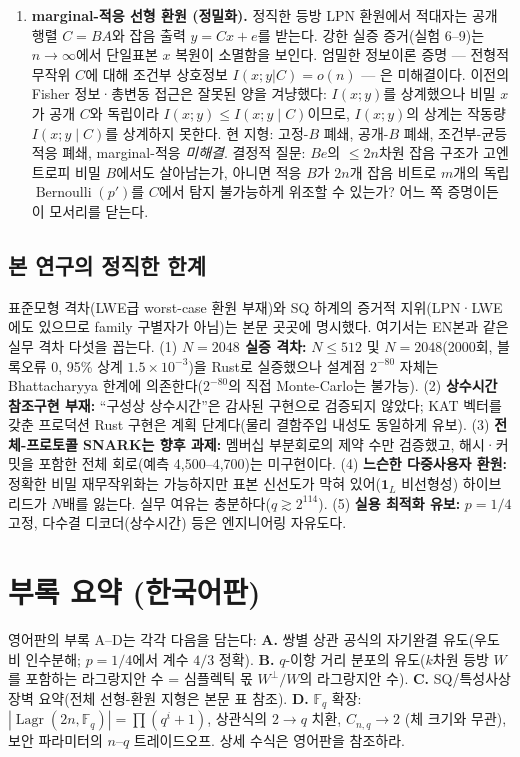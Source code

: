 \documentclass[11pt,a4paper]{article}
\theoremstyle{plain}
\theoremstyle{definition}
\newcommand{\F}{\mathbb{F}}
\DeclareMathOperator{\Lagr}{Lagr}
\begin{document}
\begin{enumerate}
\item \textbf{marginal-적응 선형 환원 (정밀화).} 정직한 등방 LPN 환원에서 적대자는 공개 행렬 $C=BA$와 잡음 출력 $y=Cx+e$를 받는다. 강한 실증 증거(실험 6--9)는 $n\to\infty$에서 단일표본 $x$ 복원이 소멸함을 보인다. 엄밀한 정보이론 증명 --- 전형적 무작위 $C$에 대해 조건부 상호정보 $I(x;y|C)=o(n)$ --- 은 미해결이다. 이전의 Fisher 정보·총변동 접근은 잘못된 양을 겨냥했다: $I(x;y)$를 상계했으나 비밀 $x$가 공개 $C$와 독립이라 $I(x;y) \le I(x;y\mid C)$이므로, $I(x;y)$의 상계는 작동량 $I(x;y\mid C)$를 상계하지 못한다. 현 지형: 고정-$B$ 폐쇄, 공개-$B$ 폐쇄, 조건부-균등 적응 폐쇄, marginal-적응 \emph{미해결}. 결정적 질문: $Be$의 $\le 2n$차원 잡음 구조가 고엔트로피 비밀 $B$에서도 살아남는가, 아니면 적응 $B$가 $2n$개 잡음 비트로 $m$개의 독립 $\operatorname{Bernoulli}(p')$를 $C$에서 탐지 불가능하게 위조할 수 있는가? 어느 쪽 증명이든 이 모서리를 닫는다.
\end{enumerate}

\subsection{본 연구의 정직한 한계}

표준모형 격차(LWE급 worst-case 환원 부재)와 SQ 하계의 증거적 지위(LPN·LWE에도 있으므로 family 구별자가 아님)는 본문 곳곳에 명시했다. 여기서는 EN본과 같은 실무 격차 다섯을 꼽는다. (1) \textbf{$N=2048$ 실증 격차:} $N\le512$ 및 $N=2048$(2000회, 블록오류 0, 95\% 상계 $1.5\times10^{-3}$)을 Rust로 실증했으나 설계점 $2^{-80}$ 자체는 Bhattacharyya 한계에 의존한다($2^{-80}$의 직접 Monte-Carlo는 불가능). (2) \textbf{상수시간 참조구현 부재:} ``구성상 상수시간''은 감사된 구현으로 검증되지 않았다; KAT 벡터를 갖춘 프로덕션 Rust 구현은 계획 단계다(물리 결함주입 내성도 동일하게 유보). (3) \textbf{전체-프로토콜 SNARK는 향후 과제:} 멤버십 부분회로의 제약 수만 검증했고, 해시·커밋을 포함한 전체 회로(예측 4{,}500--4{,}700)는 미구현이다. (4) \textbf{느슨한 다중사용자 환원:} 정확한 비밀 재무작위화는 가능하지만 표본 신선도가 막혀 있어($\mathbf{1}_L$ 비선형성) 하이브리드가 $N$배를 잃는다. 실무 여유는 충분하다($q \gtrsim 2^{114}$). (5) \textbf{실용 최적화 유보:} $p=1/4$ 고정, 다수결 디코더(상수시간) 등은 엔지니어링 자유도다.

\section*{부록 요약 (한국어판)}

영어판의 부록 A--D는 각각 다음을 담는다: \textbf{A.} 쌍별 상관 공식의 자기완결 유도(우도비 인수분해; $p=1/4$에서 계수 $4/3$ 정확). \textbf{B.} $q$-이항 거리 분포의 유도($k$차원 등방 $W$를 포함하는 라그랑지안 수 = 심플렉틱 몫 $W^\perp/W$의 라그랑지안 수). \textbf{C.} SQ/특성사상 장벽 요약(전체 선형-환원 지형은 본문 표 참조). \textbf{D.} $\F_q$ 확장: $|\Lagr(2n,\F_q)| = \prod(q^i+1)$, 상관식의 $2 \to q$ 치환, $C_{n,q} \to 2$ (체 크기와 무관), 보안 파라미터의 $n$--$q$ 트레이드오프. 상세 수식은 영어판을 참조하라.
\end{document}
